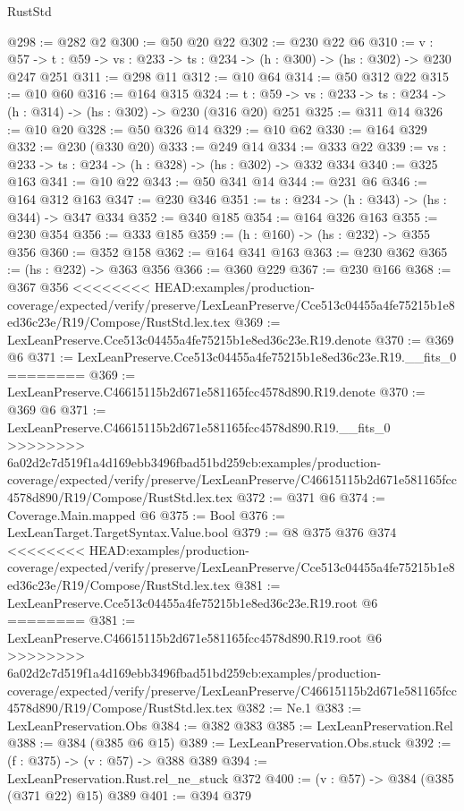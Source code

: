 \begin{lexlean}{RustStd}
\begin{coremodule}
{\begin{coremodule}
@298 := @282 @2
@300 := @50 @20 @22
@302 := @230 @22 @6
@310 := {v : @57} ->
  {t : @59} -> {vs : @233} -> {ts : @234} -> (h : @300) -> (hs : @302) -> @230 @247 @251
@311 := @298 @11
@312 := @10 @64
@314 := @50 @312 @22
@315 := @10 @60
@316 := @164 @315
@324 := {t : @59} -> {vs : @233} -> {ts : @234} -> (h : @314) -> (hs : @302) -> @230 (@316 @20) @251
@325 := @311 @14
@326 := @10 @20
@328 := @50 @326 @14
@329 := @10 @62
@330 := @164 @329
@332 := @230 (@330 @20)
@333 := @249 @14
@334 := @333 @22
@339 := {vs : @233} -> {ts : @234} -> (h : @328) -> (hs : @302) -> @332 @334
@340 := @325 @163
@341 := @10 @22
@343 := @50 @341 @14
@344 := @231 @6
@346 := @164 @312 @163
@347 := @230 @346
@351 := {ts : @234} -> (h : @343) -> (hs : @344) -> @347 @334
@352 := @340 @185
@354 := @164 @326 @163
@355 := @230 @354
@356 := @333 @185
@359 := (h : @160) -> (hs : @232) -> @355 @356
@360 := @352 @158
@362 := @164 @341 @163
@363 := @230 @362
@365 := (hs : @232) -> @363 @356
@366 := @360 @229
@367 := @230 @166
@368 := @367 @356
<<<<<<<< HEAD:examples/production-coverage/expected/verify/preserve/LexLeanPreserve/Cce513c04455a4fe75215b1e8ed36c23e/R19/Compose/RustStd.lex.tex
@369 := LexLeanPreserve.Cce513c04455a4fe75215b1e8ed36c23e.R19.denote
@370 := @369 @6
@371 := LexLeanPreserve.Cce513c04455a4fe75215b1e8ed36c23e.R19.__fits_0
========
@369 := LexLeanPreserve.C46615115b2d671e581165fcc4578d890.R19.denote
@370 := @369 @6
@371 := LexLeanPreserve.C46615115b2d671e581165fcc4578d890.R19.__fits_0
>>>>>>>> 6a02d2c7d519f1a4d169ebb3496fbad51bd259cb:examples/production-coverage/expected/verify/preserve/LexLeanPreserve/C46615115b2d671e581165fcc4578d890/R19/Compose/RustStd.lex.tex
@372 := @371 @6
@374 := Coverage.Main.mapped @6
@375 := Bool
@376 := LexLeanTarget.TargetSyntax.Value.bool
@379 := @8 @375 @376 @374
<<<<<<<< HEAD:examples/production-coverage/expected/verify/preserve/LexLeanPreserve/Cce513c04455a4fe75215b1e8ed36c23e/R19/Compose/RustStd.lex.tex
@381 := LexLeanPreserve.Cce513c04455a4fe75215b1e8ed36c23e.R19.root @6
========
@381 := LexLeanPreserve.C46615115b2d671e581165fcc4578d890.R19.root @6
>>>>>>>> 6a02d2c7d519f1a4d169ebb3496fbad51bd259cb:examples/production-coverage/expected/verify/preserve/LexLeanPreserve/C46615115b2d671e581165fcc4578d890/R19/Compose/RustStd.lex.tex
@382 := Ne.{1}
@383 := LexLeanPreservation.Obs
@384 := @382 @383
@385 := LexLeanPreservation.Rel
@388 := @384 (@385 @6 @15)
@389 := LexLeanPreservation.Obs.stuck
@392 := (f : @375) -> (v : @57) -> @388 @389
@394 := LexLeanPreservation.Rust.rel_ne_stuck @372
@400 := (v : @57) -> @384 (@385 (@371 @22) @15) @389
@401 := @394 @379

\end{coremodule}}
\end{coremodule}
\end{lexlean}
